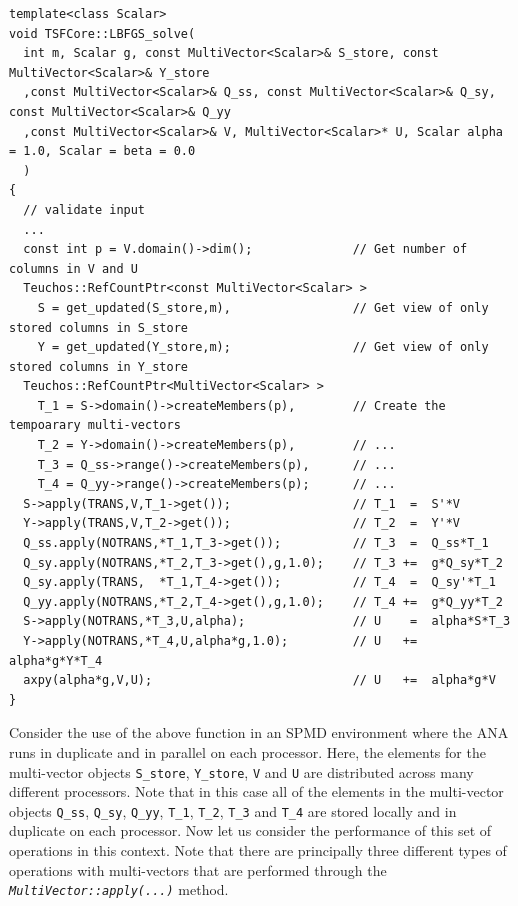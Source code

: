 {\scriptsize\begin{verbatim}
template<class Scalar>
void TSFCore::LBFGS_solve(
  int m, Scalar g, const MultiVector<Scalar>& S_store, const MultiVector<Scalar>& Y_store
  ,const MultiVector<Scalar>& Q_ss, const MultiVector<Scalar>& Q_sy, const MultiVector<Scalar>& Q_yy
  ,const MultiVector<Scalar>& V, MultiVector<Scalar>* U, Scalar alpha = 1.0, Scalar = beta = 0.0
  )
{
  // validate input
  ...
  const int p = V.domain()->dim();              // Get number of columns in V and U
  Teuchos::RefCountPtr<const MultiVector<Scalar> >
    S = get_updated(S_store,m),                 // Get view of only stored columns in S_store
    Y = get_updated(Y_store,m);                 // Get view of only stored columns in Y_store
  Teuchos::RefCountPtr<MultiVector<Scalar> >
    T_1 = S->domain()->createMembers(p),        // Create the tempoarary multi-vectors
    T_2 = Y->domain()->createMembers(p),        // ...
    T_3 = Q_ss->range()->createMembers(p),      // ...
    T_4 = Q_yy->range()->createMembers(p);      // ...
  S->apply(TRANS,V,T_1->get());                 // T_1  =  S'*V
  Y->apply(TRANS,V,T_2->get());                 // T_2  =  Y'*V
  Q_ss.apply(NOTRANS,*T_1,T_3->get());          // T_3  =  Q_ss*T_1
  Q_sy.apply(NOTRANS,*T_2,T_3->get(),g,1.0);    // T_3 +=  g*Q_sy*T_2
  Q_sy.apply(TRANS,  *T_1,T_4->get());          // T_4  =  Q_sy'*T_1
  Q_yy.apply(NOTRANS,*T_2,T_4->get(),g,1.0);    // T_4 +=  g*Q_yy*T_2
  S->apply(NOTRANS,*T_3,U,alpha);               // U    =  alpha*S*T_3
  Y->apply(NOTRANS,*T_4,U,alpha*g,1.0);         // U   +=  alpha*g*Y*T_4
  axpy(alpha*g,V,U);                            // U   +=  alpha*g*V
}
\end{verbatim}}

Consider the use of the above function in an SPMD environment where
the ANA runs in duplicate and in parallel on each processor.  Here,
the elements for the multi-vector objects {}\texttt{S\_store},
{}\texttt{Y\_store}, {}\texttt{V} and {}\texttt{U} are distributed
across many different processors.  Note that in this case all of the
elements in the multi-vector objects {}\texttt{Q\_ss},
{}\texttt{Q\_sy}, {}\texttt{Q\_yy}, {}\texttt{T\_1}, {}\texttt{T\_2},
{}\texttt{T\_3} and {}\texttt{T\_4} are stored locally and in
duplicate on each processor.  Now let us consider the performance of
this set of operations in this context.  Note that there are
principally three different types of operations with multi-vectors
that are performed through the
{}\texttt{\textit{Multi\-Vector\-::apply(\-...)}} method.

